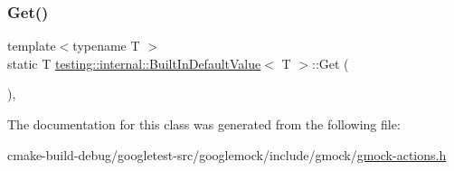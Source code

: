 \mbox{\label{classtesting_1_1internal_1_1BuiltInDefaultValue_a7e26c1df14a887c8f393b29d6ea162e6}} 
\subsubsection{\texorpdfstring{Get()}{Get()}}
{\footnotesize\ttfamily template$<$typename T $>$ \\
static T \mbox{\hyperlink{classtesting_1_1internal_1_1BuiltInDefaultValue}{testing\+::internal\+::\+Built\+In\+Default\+Value}}$<$ T $>$\+::Get (\begin{DoxyParamCaption}{ }\end{DoxyParamCaption})\hspace{0.3cm}{\ttfamily [inline]}, {\ttfamily [static]}}



The documentation for this class was generated from the following file\+:\begin{DoxyCompactItemize}
\item 
cmake-\/build-\/debug/googletest-\/src/googlemock/include/gmock/\mbox{\hyperlink{gmock-actions_8h}{gmock-\/actions.\+h}}\end{DoxyCompactItemize}
